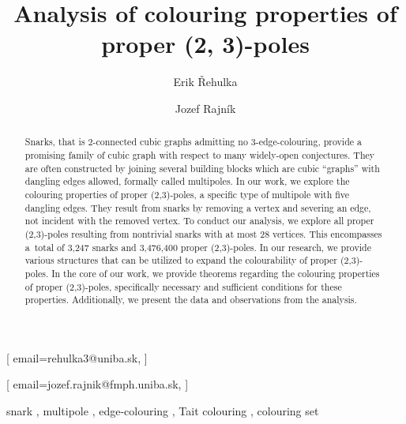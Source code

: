 \documentclass[
twocolumn,
]{ceurart}
\begin{document}


\title{Analysis of colouring properties of proper (2, 3)-poles}


\author[1]{Erik Řehulka}[%
email=rehulka3@uniba.sk,
]
\address[1]{Comenius University, Mlynská dolina, 842 48 Bratislava, Slovakia}

\author[1]{Jozef Rajník}[%
email=jozef.rajnik@fmph.uniba.sk,
]

\begin{abstract}
  Snarks, that is $2$-connected cubic graphs admitting no $3$-edge-colouring, provide a promising family of cubic graph with respect to many widely-open conjectures. They are often constructed by joining several building blocks which are cubic ``graphs'' with dangling edges allowed, formally called multipoles. In our work, we explore the colouring properties of proper (2,3)-poles, a specific type of multipole with five dangling edges. They result from snarks by removing a vertex and severing an edge, not incident with the removed vertex. To conduct our analysis, we explore all proper (2,3)-poles resulting from nontrivial snarks with at most 28 vertices. This encompasses a~total of 3,247 snarks and 3,476,400 proper (2,3)-poles. In our research, we provide various structures that can be utilized to expand the colourability of proper (2,3)-poles. In the core of our work, we provide theorems regarding the colouring properties of proper (2,3)-poles, specifically necessary and sufficient conditions for these properties. Additionally, we present the data and observations from the analysis.
\end{abstract}

\begin{keywords}
	snark \sep 
	multipole \sep 
	edge-colouring \sep 
	Tait colouring \sep 
	colouring set
\end{keywords}

\maketitle


 


%


\end{document}
